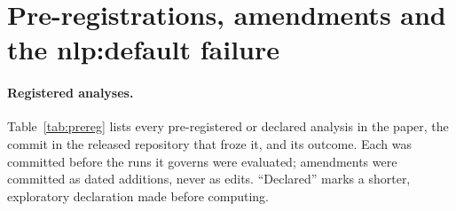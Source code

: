 \documentclass{article}
\begin{document}
\section{Pre-registrations, amendments and the nlp:default failure}
\label{app:prereg}
\paragraph{Registered analyses.} Table~\ref{tab:prereg} lists every pre-registered or declared analysis
in the paper, the commit in the released repository that froze it, and its outcome. Each was committed
before the runs it governs were evaluated; amendments were committed as dated additions, never as edits.
``Declared'' marks a shorter, exploratory declaration made before computing.
\end{document}
